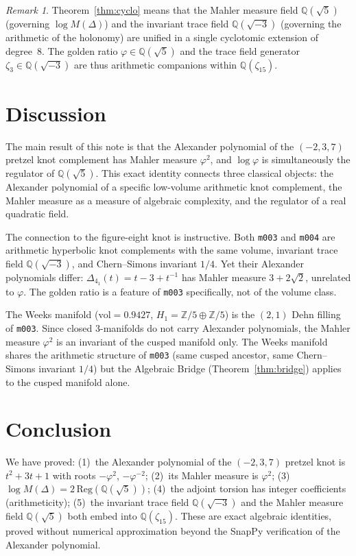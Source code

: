 \documentclass[12pt]{article}
\theoremstyle{definition}
\theoremstyle{remark}
\newtheorem{remark}[theorem]{Remark}
\newcommand{\Z}{\mathbb{Z}}
\newcommand{\Q}{\mathbb{Q}}
\newcommand{\vp}{\varphi}
\begin{document}
\begin{remark}
Theorem~\ref{thm:cyclo} means that the Mahler measure field $\Q(\sqrt5)$
(governing $\log M(\Delta)$) and the invariant trace field $\Q(\sqrt{-3})$
(governing the arithmetic of the holonomy) are unified in a single
cyclotomic extension of degree~8.  The golden ratio $\vp\in\Q(\sqrt5)$
and the trace field generator $\zeta_3\in\Q(\sqrt{-3})$ are thus
arithmetic companions within $\Q(\zeta_{15})$.
\end{remark}

\section{Discussion}
\label{sec:discussion}

The main result of this note is that the Alexander polynomial of the
$(-2,3,7)$ pretzel knot complement has Mahler measure $\vp^2$, and
$\log\vp$ is simultaneously the regulator of $\Q(\sqrt5)$.  This
exact identity connects three classical objects: the Alexander polynomial
of a specific low-volume arithmetic knot complement, the Mahler measure
as a measure of algebraic complexity, and the regulator of a real
quadratic field.

The connection to the figure-eight knot is instructive.  Both
\texttt{m003} and \texttt{m004} are arithmetic hyperbolic knot
complements with the same volume, invariant trace field $\Q(\sqrt{-3})$,
and Chern--Simons invariant $1/4$.  Yet their Alexander polynomials
differ: $\Delta_{4_1}(t)=t-3+t^{-1}$ has Mahler measure $3+2\sqrt2$,
unrelated to $\vp$.  The golden ratio is a feature of \texttt{m003}
specifically, not of the volume class.

The Weeks manifold ($\mathrm{vol}=0.9427$, $H_1=\Z/5\oplus\Z/5$) is
the $(2,1)$ Dehn filling of \texttt{m003}.  Since closed 3-manifolds
do not carry Alexander polynomials, the Mahler measure $\vp^2$ is an
invariant of the cusped manifold only.  The Weeks manifold shares the
arithmetic structure of \texttt{m003} (same cusped ancestor, same
Chern--Simons invariant $1/4$) but the Algebraic Bridge
(Theorem~\ref{thm:bridge}) applies to the cusped manifold alone.

\section{Conclusion}

We have proved: (1)~the Alexander polynomial of the $(-2,3,7)$ pretzel
knot is $t^2+3t+1$ with roots $-\vp^2$, $-\vp^{-2}$;
(2)~its Mahler measure is $\vp^2$;
(3)~$\log M(\Delta)=2\,\mathrm{Reg}(\Q(\sqrt5))$;
(4)~the adjoint torsion has integer coefficients (arithmeticity);
(5)~the invariant trace field $\Q(\sqrt{-3})$ and the Mahler
measure field $\Q(\sqrt5)$ both embed into $\Q(\zeta_{15})$.
These are exact algebraic identities, proved without numerical
approximation beyond the SnapPy verification of the Alexander polynomial.



\end{document}

